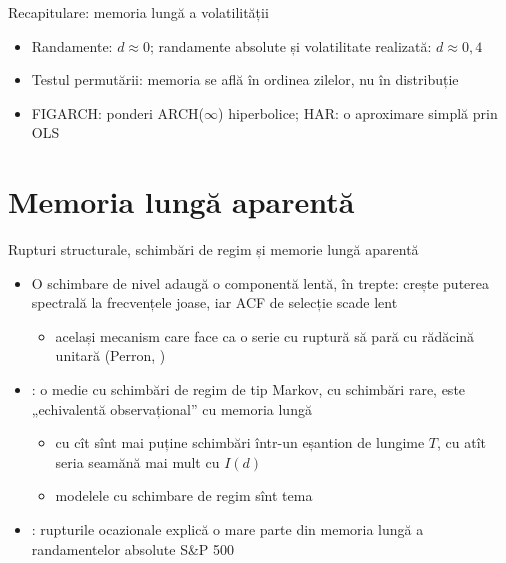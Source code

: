 \begin{frame}{Recapitulare: memoria lungă a volatilității}
\itemsize{\small}
\begin{itemize}
    \item Randamente: $d \approx 0$; randamente absolute și volatilitate realizată: $d \approx 0{,}4$
    \item Testul permutării: memoria se află în ordinea zilelor, nu în distribuție
    \item FIGARCH: ponderi ARCH($\infty$) hiperbolice; HAR: o aproximare simplă prin OLS
\end{itemize}
\end{frame}


\section{Memoria lungă aparentă}

\begin{frame}{Rupturi structurale, schimbări de regim și memorie lungă aparentă}
\itemsize{\small}
\begin{itemize}
    \item O schimbare de nivel adaugă o componentă lentă, în trepte: crește puterea spectrală la frecvențele joase, iar ACF de selecție scade lent
    \begin{itemize}
        \item același mecanism care face ca o serie cu ruptură să pară cu rădăcină unitară (Perron, )
    \end{itemize}
    \item {}: o medie cu schimbări de regim de tip Markov, cu schimbări rare, este „echivalentă observațional” cu memoria lungă
    \begin{itemize}
        \item cu cît sînt mai puține schimbări într-un eșantion de lungime $T$, cu atît seria seamănă mai mult cu $I(d)$
        \item modelele cu schimbare de regim sînt tema 
    \end{itemize}
    \item {}: rupturile ocazionale explică o mare parte din memoria lungă a randamentelor absolute S\&P 500
\end{itemize}
\end{frame}

